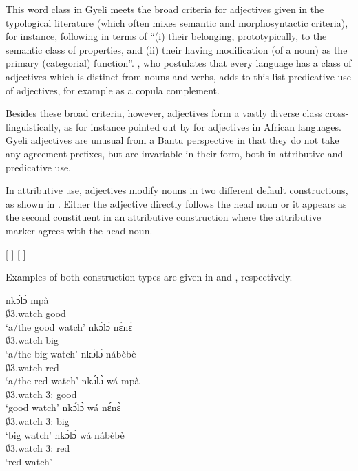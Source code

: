 This word class in Gyeli meets the broad criteria for adjectives given in the typological literature (which often mixes semantic and morphosyntactic criteria), for instance, following \citet[16]{bhat94} in terms of ``(i) their belonging, prototypically, to the semantic class of properties, and (ii) their having modification (of a noun) as the primary (categorial) function''. 
\citet{dixon2004}, who postulates that every language has a class of adjectives which is distinct from nouns and verbs, adds to this list predicative use of adjectives, for example as a copula complement. 

Besides these broad criteria, however, adjectives form a vastly diverse class cross-linguistically, as for instance pointed out by \citet{segerer2008} for adjectives in African languages. Gyeli adjectives are unusual from a Bantu perspective in that they do not take any agreement prefixes, but are invariable in their form, both in attributive and predicative use.

In attributive use, adjectives modify nouns in two different default constructions, as shown in . Either the adjective directly follows the head noun or it appears as the second constituent in an attributive construction where the attributive marker agrees with the head noun.

\ea \label{ADJtemp}
    \ea {}[{\N} {\ADJ}]
    \ex {}[{\N} {\ATT} {\ADJ}]
    \z
\z

\noindent Examples of both construction types are given in  and , respectively.

\ea \label{qualia}
  \ea \label{qualia1}
 \gll  nkɔ́lɔ̀ mpà  \\
          $\emptyset$3.watch good  \\
    \trans `a/the good watch'
\ex \label{qualia2}
  \gll   nkɔ́lɔ̀ nɛ́nɛ̀ \\
          $\emptyset$3.watch big \\
    \trans `a/the big watch'
\ex \label{qualia3}
  \gll    nkɔ́lɔ̀ nábèbè \\
          $\emptyset$3.watch red \\
    \trans `a/the red watch'
\z
\ex \label{qualib}
  \ea \label{qualib1}
 \gll  nkɔ́lɔ̀ wá mpà  \\
          $\emptyset$3.watch 3:{\ATT} good  \\
    \trans `good watch'
\ex \label{qualib2}
  \gll   nkɔ́lɔ̀ wá nɛ́nɛ̀ \\
          $\emptyset$3.watch 3:{\ATT} big \\
    \trans `big watch'
\ex \label{qualib3}
  \gll    nkɔ́lɔ̀ wá nábèbè \\
          $\emptyset$3.watch 3:{\ATT} red \\
    \trans `red watch'
\z
\z

